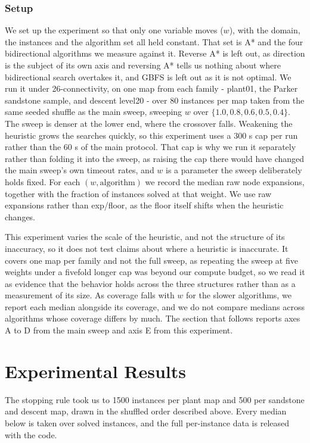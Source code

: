 \documentclass[letterpaper]{article} %
\begin{document}
\subsubsection{Setup}
We set up the experiment so that only one variable moves ($w$), with the domain, the instances and the algorithm set all held constant. That set is A* and the four bidirectional algorithms we measure against it. Reverse A* is left out, as direction is the subject of its own axis and reversing A* tells us nothing about where bidirectional search overtakes it, and GBFS is left out as it is not optimal. We run it under 26-connectivity, on one map from each family - plant01, the Parker sandstone sample, and descent level20 - over 80 instances per map taken from the same seeded shuffle as the main sweep, sweeping $w$ over $\{1.0, 0.8, 0.6, 0.5, 0.4\}$. The sweep is denser at the lower end, where the crossover falls. Weakening the heuristic grows the searches quickly, so this experiment uses a 300 s cap per run rather than the 60 s of the main protocol. That cap is why we run it separately rather than folding it into the sweep, as raising the cap there would have changed the main sweep's own timeout rates, and $w$ is a parameter the sweep deliberately holds fixed. For each $(w, \text{algorithm})$ we record the median raw node expansions, together with the fraction of instances solved at that weight. We use raw expansions rather than exp/floor, as the floor itself shifts when the heuristic changes.

This experiment varies the scale of the heuristic, and not the structure of its inaccuracy, so it does not test claims about where a heuristic is inaccurate. It covers one map per family and not the full sweep, as repeating the sweep at five weights under a fivefold longer cap was beyond our compute budget, so we read it as evidence that the behavior holds across the three structures rather than as a measurement of its size. As coverage falls with $w$ for the slower algorithms, we report each median alongside its coverage, and we do not compare medians across algorithms whose coverage differs by much. The section that follows reports axes A to D from the main sweep and axis E from this experiment.

\section{Experimental Results}
The stopping rule took us to 1500 instances per plant map and 500 per sandstone and descent map, drawn in the shuffled order described above. Every median below is taken over solved instances, and the full per-instance data is released with the code.
\end{document}
